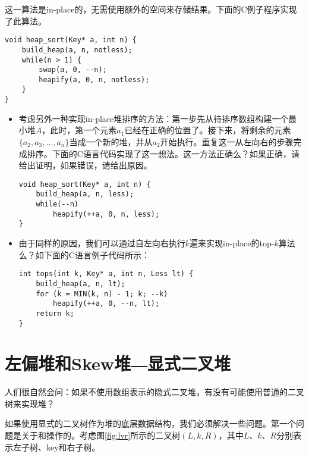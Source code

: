 \documentclass[UTF8]{article}
\begin{document}
这一算法是in-place的，无需使用额外的空间来存储结果。下面的C例子程序实现了此算法。

\lstset{language=C}
\begin{lstlisting}
void heap_sort(Key* a, int n) {
    build_heap(a, n, notless);
    while(n > 1) {
        swap(a, 0, --n);
        heapify(a, 0, n, notless);
    }
}
\end{lstlisting}

\begin{Exercise}
\begin{itemize}
\item 考虑另外一种实现in-place堆排序的方法：第一步先从待排序数组构建一个最小堆$A$，此时，第一个元素$a_1$已经在正确的位置了。接下来，将剩余的元素$\{a_2, a_3, ..., a_n\}$当成一个新的堆，并从$a_2$开始执行。重复这一从左向右的步骤完成排序。下面的C语言代码实现了这一想法。这一方法正确么？如果正确，请给出证明，如果错误，请给出原因。
\lstset{language=C}
\begin{lstlisting}
void heap_sort(Key* a, int n) {
    build_heap(a, n, less);
    while(--n)
        heapify(++a, 0, n, less);
}
\end{lstlisting}

\item 由于同样的原因，我们可以通过自左向右执行$k$遍来实现in-place的top-$k$算法么？如下面的C语言例子代码所示：
\lstset{language=C}
\begin{lstlisting}
int tops(int k, Key* a, int n, Less lt) {
    build_heap(a, n, lt);
    for (k = MIN(k, n) - 1; k; --k)
        heapify(++a, 0, --n, lt);
    return k;
}
\end{lstlisting}
\end{itemize}
\end{Exercise}

\section{左偏堆和Skew堆―显式二叉堆}
\label{ebheap}

人们很自然会问：如果不使用数组表示的隐式二叉堆，有没有可能使用普通的二叉树来实现堆？

如果使用显式的二叉树作为堆的底层数据结构，我们必须解决一些问题。第一个问题是关于和操作的。考虑图\ref{fig:lvr}所示的二叉树$(L, k, R)$，其中$L$、$k$、$R$分别表示左子树、key和右子树。
\end{document}
